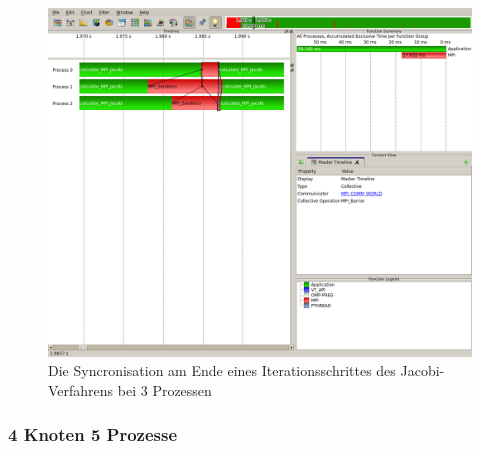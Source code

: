 \documentclass[a4paper,12pt]{scrartcl}
\begin{document}
\begin{figure}[hr!]
 \includegraphics[scale=0.45]{./3_2_JA/Syncronize.png}
 \caption{Die Syncronisation am Ende eines Iterationsschrittes des Jacobi-Verfahrens bei 3 Prozessen}
\end{figure}

\subsubsection{4 Knoten 5 Prozesse}
\end{document}
